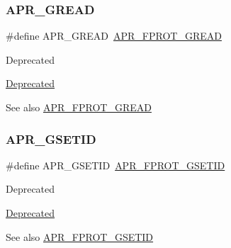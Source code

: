 \subsubsection{\texorpdfstring{A\+P\+R\+\_\+\+G\+R\+E\+AD}{APR\_GREAD}}
{\footnotesize\ttfamily \#define A\+P\+R\+\_\+\+G\+R\+E\+AD~\mbox{\hyperlink{group__apr__file__permissions_ga5ad9b67b8008db3ffc56c3c2a65aa192}{A\+P\+R\+\_\+\+F\+P\+R\+O\+T\+\_\+\+G\+R\+E\+AD}}}

\begin{DoxyRefDesc}{Deprecated}
\item[\mbox{\hyperlink{deprecated__deprecated000008}{Deprecated}}]\end{DoxyRefDesc}
\begin{DoxySeeAlso}{See also}
\mbox{\hyperlink{group__apr__file__permissions_ga5ad9b67b8008db3ffc56c3c2a65aa192}{A\+P\+R\+\_\+\+F\+P\+R\+O\+T\+\_\+\+G\+R\+E\+AD}} 
\end{DoxySeeAlso}
\mbox{\label{group__apr__file__permissions_ga4e4e9bb05f2bb156b174461551c9c329}} 
\subsubsection{\texorpdfstring{A\+P\+R\+\_\+\+G\+S\+E\+T\+ID}{APR\_GSETID}}
{\footnotesize\ttfamily \#define A\+P\+R\+\_\+\+G\+S\+E\+T\+ID~\mbox{\hyperlink{group__apr__file__permissions_ga5fcf6746afdd4e9b8be6ceab6892a3f5}{A\+P\+R\+\_\+\+F\+P\+R\+O\+T\+\_\+\+G\+S\+E\+T\+ID}}}

\begin{DoxyRefDesc}{Deprecated}
\item[\mbox{\hyperlink{deprecated__deprecated000007}{Deprecated}}]\end{DoxyRefDesc}
\begin{DoxySeeAlso}{See also}
\mbox{\hyperlink{group__apr__file__permissions_ga5fcf6746afdd4e9b8be6ceab6892a3f5}{A\+P\+R\+\_\+\+F\+P\+R\+O\+T\+\_\+\+G\+S\+E\+T\+ID}} 
\end{DoxySeeAlso}
\mbox{\label{group__apr__file__permissions_ga794c425b459aa46939f6febabbe9daef}} 
